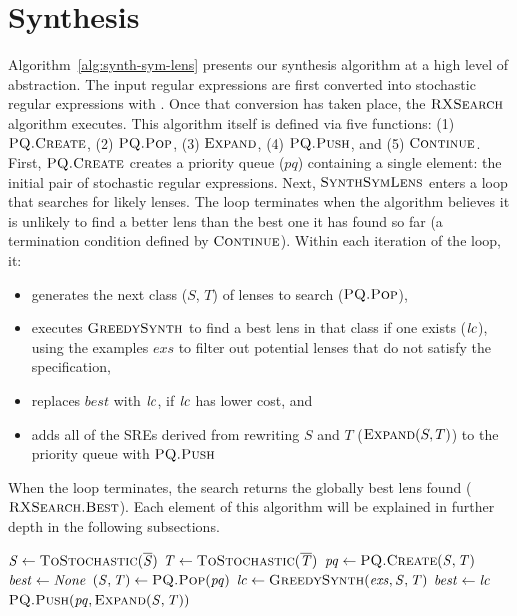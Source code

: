 \documentclass[acmsmall,screen,anonymous]{acmart}
\begin{document}
\section{Synthesis}
\label{sec:synthesis}
Algorithm~\ref{alg:synth-sym-lens} presents our synthesis algorithm at a high
level of abstraction. The input regular expressions are first converted into
stochastic regular expressions with \ToStochastic. Once that conversion has
taken place, the $\RXSearch$ algorithm executes. This algorithm itself is
defined via five functions: (1) $\PCF{\PQ.Create}$, (2) $\PCF{\PQ.Pop}$, (3)
$\PCF{Expand}$, (4) $\PCF{\PQ.Push}$, and (5) $\PCF{\Continue}$. First,
$\PCF{\PQ.Create}$ creates a priority queue ($pq$) containing a single element:
the initial pair of stochastic regular expressions. Next, $\PCF{SynthSymLens}$
enters a loop that searches for likely lenses. The loop terminates when the
algorithm believes it is unlikely to find a better lens than the best one it has
found so far (a termination condition defined by $\PCF{\Continue}$). Within each
iteration of the loop, it:
\begin{itemize}
\item generates the next class ($S$, $T$) of lenses to
search ($\PCF{\PQ.Pop}$),
\item executes $\GreedySynth$ to find a best lens in that class if
one exists ($\mathit{lc}$),
using the examples $exs$ to filter out potential lenses that do not satisfy
the specification,
\item replaces $best$ with $\mathit{lc}$, if $\mathit{lc}$ has lower cost, and
\item adds all of the SREs derived from rewriting $S$ and $T$ ($\Expand(S,T)$)
  to the priority queue with $\PCF{\PQ.Push}$
\end{itemize}
When the loop terminates, the search returns the globally best lens found
($\PCF{\RXSearch.Best}$).  Each element of this algorithm will be explained in
further depth in the following subsections.

\begin{algorithm}
  \caption{\SynthSymLens}
  \label{alg:synth-sym-lens}
  \begin{algorithmic}[1]
    \State $\Regex \gets \Call{\ToStochastic}{\BRegex}$
    \State $\RegexAlt \gets \Call{\ToStochastic}{\BRegexAlt}$
    \State $\RXSearchState \gets \Call{\PQ.Create}{\Regex,\RegexAlt}$
    \State $\mathit{best} \gets \mathit{None}$
    \While{$\Call{\Continue}{\RXSearchState,\Best}$}
    \State $(\Regex,\RegexAlt) \gets \Call{\PQ.Pop}{\RXSearchState}$
    \State $\LC \gets \Call{\GreedySynth}{\Examples,\Regex,\RegexAlt}$
    \State $\mathit{best} \gets \mathit{lc}$
    \EndIf
    \State $\Call{\PQ.Push}{\RXSearchState,\Expand(\Regex,\RegexAlt)}$
    \EndWhile
    \State {}
    \EndFunction
  \end{algorithmic}
\end{algorithm}
\end{document}
